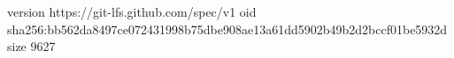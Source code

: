 version https://git-lfs.github.com/spec/v1
oid sha256:bb562da8497ce072431998b75dbe908ae13a61dd5902b49b2d2bccf01be5932d
size 9627
